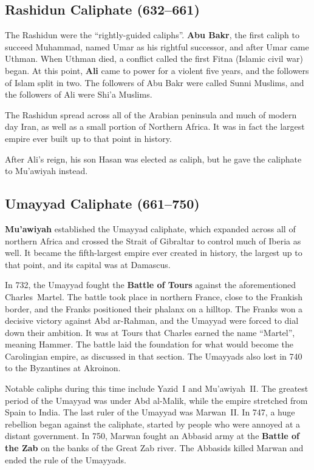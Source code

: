 \subsection*{Rashidun Caliphate (632--661)}

The Rashidun were the ``rightly-guided caliphs''.
\textbf{Abu Bakr}, the first caliph to succeed Muhammad, named Umar as his rightful successor,
and after Umar came Uthman.
When Uthman died, a conflict called the first Fitna (Islamic civil war) began.
At this point, \textbf{Ali} came to power for a violent five years,
and the followers of Islam split in two.
The followers of Abu Bakr were called Sunni Muslims, and the followers of Ali were Shi'a Muslims.

The Rashidun spread across all of the Arabian peninsula and much of modern day Iran,
as well as a small portion of Northern Africa.
It was in fact the largest empire ever built up to that point in history.

After Ali's reign, his son Hasan was elected as caliph, but he gave the caliphate to Mu'awiyah instead.

\subsection*{Umayyad Caliphate (661--750)}

\textbf{Mu'awiyah} established the Umayyad caliphate, which expanded across all of northern Africa
and crossed the Strait of Gibraltar to control much of Iberia as well.
It became the fifth-largest empire ever created in history, the largest up to that point,
and its capital was at Damascus.

In 732, the Umayyad fought the \textbf{Battle of Tours} against the aforementioned Charles~Martel.
The battle took place in northern France, close to the Frankish border,
and the Franks positioned their phalanx on a hilltop.
The Franks won a decisive victory against Abd ar-Rahman, and the Umayyad were forced to dial down their ambition.
It was at Tours that Charles earned the name ``Martel'', meaning Hammer.
The battle laid the foundation for what would become the Carolingian empire, as discussed in that section.
The Umayyads also lost in 740 to the Byzantines at Akroinon.

Notable caliphs during this time include Yazid~I and Mu'awiyah~II\@.
The greatest period of the Umayyad was under Abd al-Malik, while the empire stretched from Spain to India.
The last ruler of the Umayyad was Marwan~II\@.
In 747, a huge rebellion began against the caliphate, started by people who were annoyed at a distant government.
In 750, Marwan fought an Abbasid army at the \textbf{Battle of the Zab} on the banks of the Great Zab river.
The Abbasids killed Marwan and ended the rule of the Umayyads.

